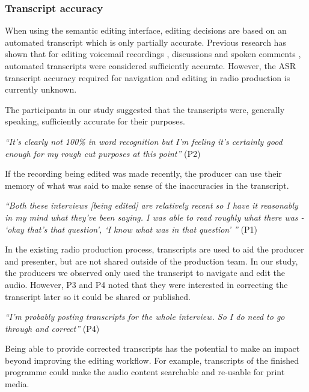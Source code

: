 \subsubsection{Transcript accuracy}
When using the semantic editing interface, editing decisions are based on an
automated transcript which is only partially accurate. Previous research has shown that for editing
voicemail recordings \citep{Whittaker2004}, discussions \citep{Sivaraman2016} and spoken comments \citep{Yoon2014},
automated transcripts were considered sufficiently accurate. However, the ASR transcript accuracy required for
navigation and editing in radio production is currently unknown.

The participants in our study suggested that the transcripts were, generally speaking, sufficiently accurate for their
purposes.

\textit{``It's clearly not 100\% in word recognition but I'm feeling it's
  certainly good enough for my rough cut purposes at this point''} (P2)

If the recording being edited was made recently, the producer can use their
memory of what was said to make sense of the inaccuracies in the
transcript.

\textit{``Both these interviews [being edited] are relatively recent so I have
  it reasonably in my mind what they've been saying. I was able to read roughly
  what there was - `okay that's that question', `I know what was in that
  question' ''} (P1)

In the existing radio production process, transcripts are used to aid the producer and presenter, but are
  not shared outside of the production team. In our study, the producers we observed only used the transcript
  to navigate and edit the audio. However, P3 and P4 noted that they were interested in correcting the transcript later
  so it could be shared or published.

\textit{``I'm probably posting transcripts for the whole interview. So I do
  need to go through and correct''} (P4)

Being able to provide corrected transcripts has the potential to make an impact beyond improving the
  editing workflow. For example, transcripts of the finished programme could make the audio content searchable and
  re-usable for print media.



